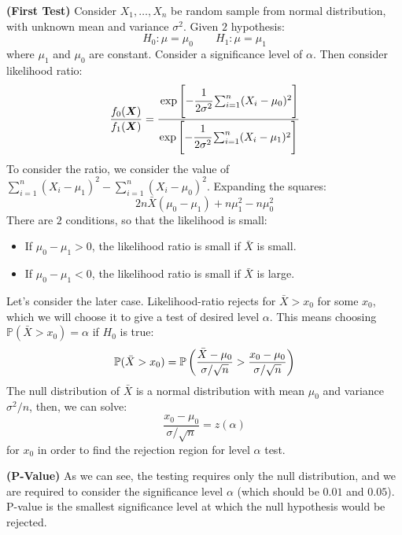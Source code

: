 \begin{example}{\textbf{(First Test)}}
    Consider $X_1,\dots,X_n$ be random sample from normal distribution, with unknown mean and variance $\sigma^2$. Given $2$ hypothesis:
    \begin{equation*}
        H_0 : \mu = \mu_0 \qquad H_1 : \mu = \mu_1
    \end{equation*}
    where $\mu_1$ and $\mu_0$ are constant. Consider a significance level of $\alpha$. Then consider likelihood ratio:
    \begin{equation*}
        \frac{f_0(\boldsymbol X)}{f_1(\boldsymbol X)} = \cfrac{\exp\left[ -\cfrac{1}{2\sigma^2} \sum^n_{i=1}(X_i-\mu_0)^2  \right]}{\exp\left[ -\cfrac{1}{2\sigma^2} \sum^n_{i=1}(X_i-\mu_1)^2  \right]}
    \end{equation*}
    To consider the ratio, we consider the value of $\sum^n_{i=1}(X_i - \mu_1)^2 - \sum^n_{i=1}(X_i - \mu_0)^2$. Expanding the squares:
    \begin{equation*}
        2n\bar{X}(\mu_0 -\mu_1) + n\mu_1^2 - n\mu_0^2
    \end{equation*}
    There are $2$ conditions, so that the likelihood is small:
    \begin{itemize}
        \item If $\mu_0-\mu_1>0$, the likelihood ratio is small if $\bar{X}$ is small. 
        \item If $\mu_0 - \mu_1 < 0$, the likelihood ratio is small if $\bar{X}$ is large. 
    \end{itemize}
    Let's consider the later case. Likelihood-ratio rejects for $\bar{X} > x_0$ for some $x_0$, which we will choose it to give a test of desired level $\alpha$. This means choosing $\mathbb{P}(\bar{X} > x_0) = \alpha$ if $H_0$ is true:
    \begin{equation*}
        \mathbb{P}(\bar{X}>x_0) = \mathbb{P}\left(  \frac{\bar{X} - \mu_0}{\sigma/\sqrt{n}} > \frac{x_0 - \mu_0}{\sigma/\sqrt{n}} \right)
    \end{equation*}
    The null distribution of $\bar{X}$ is a normal distribution with mean $\mu_0$ and variance $\sigma^2/n$, then, we can solve:
    \begin{equation*}
        \frac{x_0 - \mu_0}{\sigma/\sqrt{n}} = z(\alpha)
    \end{equation*}
    for $x_0$ in order to find the rejection region for level $\alpha$ test.
\end{example}

\begin{definition}{\textbf{(P-Value)}}
    As we can see, the testing requires only the null distribution, and we are required to consider the significance level $\alpha$ (which should be $0.01$ and $0.05$). P-value is the smallest significance level at which the null hypothesis would be rejected. 
\end{definition}

